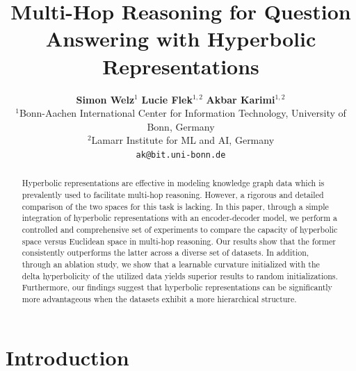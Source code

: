 \documentclass[11pt]{article}
\title{Multi-Hop Reasoning for Question Answering with Hyperbolic Representations}
\author{\textbf{Simon Welz}$^{1}$ \quad \textbf{Lucie Flek}$^{1,2}$ \quad \textbf{Akbar Karimi}$^{1,2}$ \\ 
$^1$Bonn-Aachen International Center for Information Technology, University of Bonn, Germany \\
$^2$Lamarr Institute for ML and AI, Germany \\
\texttt{ak@bit.uni-bonn.de}
}
\begin{document}
\maketitle

\begin{abstract}
Hyperbolic representations are effective in modeling knowledge graph data which is prevalently used to facilitate multi-hop reasoning. However, a rigorous and detailed comparison of the two spaces for this task is lacking. In this paper, through a simple integration of hyperbolic representations with an encoder-decoder model, we perform a controlled and comprehensive set of experiments to compare the capacity of hyperbolic space versus Euclidean space in multi-hop reasoning. Our results show that the former consistently outperforms the latter across a diverse set of datasets. In addition, through an ablation study, we show that a learnable curvature initialized with the delta hyperbolicity of the utilized data yields superior results to random initializations. Furthermore, our findings suggest that hyperbolic representations can be significantly more advantageous when the datasets exhibit a more hierarchical structure.
\end{abstract}
\section{Introduction}
\end{document}
